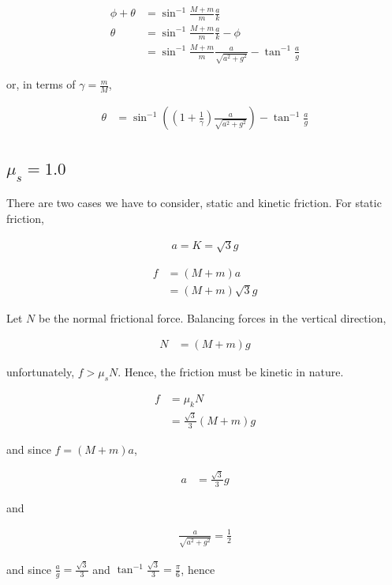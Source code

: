 \documentclass{article}
\newcommand{\half}{\frac{1}{2}}
\begin{document}
\begin{align*}
\phi + \theta &= \sin^{-1}{\frac{M+m}{m}\frac{a}{k}} \\
\theta &= \sin^{-1}{\frac{M+m}{m}\frac{a}{k}} - \phi \\
&= \sin^{-1}{\frac{M+m}{m}\frac{a}{\sqrt{a^2 + g^2}}} - \tan^{-1}{\frac{a}{g}}
\end{align*}

or, in terms of $\gamma = \frac{m}{M}$,

\begin{align*}
\theta &= \sin^{-1}((1 + \frac{1}{\gamma}) \frac{a}{\sqrt{a^2 + g^2}}) - \tan^{-1}{\frac{a}{g}}
\end{align*}

\subsection{$\mu_s = 1.0$}

There are two cases we have to consider, static and kinetic friction. For static friction, 

\begin{align*}
a = K = \sqrt{3}g
\end{align*}

\begin{align*}
f &= (M+m)a \\
&= (M+m)\sqrt{3}g
\end{align*}

Let $N$ be the normal frictional force. Balancing forces in the vertical direction,

\begin{align*}
N &= (M+m)g
\end{align*}

unfortunately, $f > \mu_sN$. Hence, the friction must be kinetic in nature.

\begin{align*}
f &= \mu_kN \\
&= \frac{\sqrt 3}{3}(M+m)g
\end{align*}

and since $f = (M+m)a$,

\begin{align*}
a &= \frac{\sqrt 3}{3}g
\end{align*}

and

\begin{align*}
\frac{a}{\sqrt{a^2 + g^2}} = \half
\end{align*}

and since $\frac{a}{g} = \frac{\sqrt 3}{3}$ and $\tan^{-1} \frac{\sqrt 3}{3} = \frac{\pi}{6}$, hence
\end{document}

